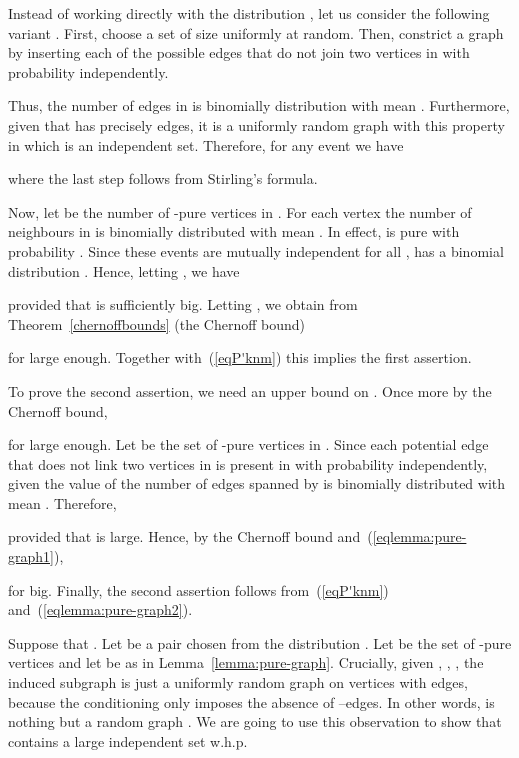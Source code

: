\documentclass[a4paper,10pt]{article}
\makeatletter
\newenvironment{proof}{\noindent{\bf Proof\@:}}{\hfill \\}
\newcommand{\whp}{w.h.p.}
\newcommand\Lem{Lemma}
\newcommand\Thm{Theorem}
\makeatother
\begin{document}
\begin{proof}
Instead of working directly with the distribution ,
let us consider the following variant . First,
choose a set  of size  uniformly at random.
Then, constrict a graph  by inserting each of the  possible
edges that do not join two vertices in  with probability
 independently.

Thus, the number of edges in  is binomially distribution with
mean . Furthermore, given that  has precisely  edges, it
is a uniformly random graph with this property in which 
is an independent set. Therefore, for any event  we have
	
where the last step follows from Stirling's formula.

Now, let  be the number of -pure vertices in .
For each vertex  the number of neighbours in 
is binomially distributed with mean . In effect,  is pure with
probability . Since these events are mutually independent for
all ,  has a binomial distribution .
Hence, letting , we have
	
provided that  is sufficiently big.
Letting , we obtain from \Thm~\ref{chernoffbounds} (the Chernoff bound)
	
for  large enough.
Together with~(\ref{eqP'knm}) this implies the first assertion.

To prove the second assertion, we need an upper bound on .
Once more by the Chernoff bound,
	
for  large enough.
Let  be the set of -pure vertices in .
Since each potential edge that does not link two vertices in 
is present in  with probability  independently, given the value
of  the number  of edges spanned by  is binomially distributed
with mean .
Therefore,
	
provided that  is large.
Hence, by the Chernoff bound and~(\ref{eqlemma:pure-graph1}),
	
for  big.
Finally, the second assertion follows from~(\ref{eqP'knm}) and~(\ref{eqlemma:pure-graph2}).
\end{proof}


\noindent{\bf Proof of \Thm~\ref{theorem:non-maximal}.}
Suppose that . Let  be a pair
chosen from the distribution . Let  be the set
of -pure vertices and let  be as in \Lem~\ref{lemma:pure-graph}.
Crucially, given , , , the induced subgraph 
is just a uniformly random graph on  vertices with  edges,
because the conditioning only imposes the absence of --edges.
In other words,  is nothing but a random graph .
We are going to use this observation to show that 
contains a large independent set \whp\
\end{document}
